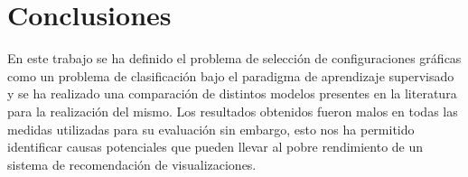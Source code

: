 \documentclass[a4paper,10pt,twocolumn]{article}
\begin{document}







\section{Conclusiones}\label{sec:conc}
	En este trabajo se ha definido el problema de selecci\'on de configuraciones 
	gr\'aficas como un problema de clasificaci\'on bajo el paradigma de
	aprendizaje supervisado y se ha realizado una comparaci\'on
	de distintos modelos presentes en la literatura para la realizaci\'on del mismo.
	Los resultados obtenidos fueron malos en todas las medidas utilizadas para su 
	evaluaci\'on sin embargo, esto nos ha permitido identificar causas potenciales que
	pueden llevar al pobre rendimiento de un sistema de recomendaci\'on de visualizaciones.


\end{document}
